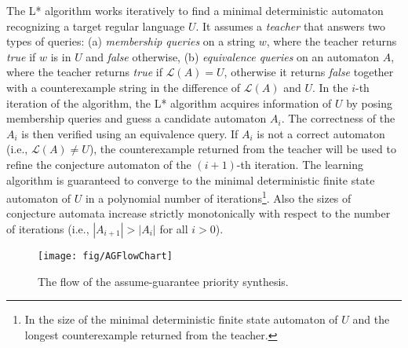\documentclass[10pt, a4paper, onecolumn, conference, compsocconf]{IEEEtran}
\begin{document}
The L* algorithm works iteratively to find a minimal deterministic automaton recognizing a target regular language $U$. It assumes a \textit{teacher} that answers two types of queries: (a) \textit{membership queries} on a string $w$,  where the teacher returns \emph{true} if $w$ is in $U$ and \emph{false} otherwise, (b) \textit{equivalence queries} on an automaton $A$, where the teacher returns \emph{true} if $\mathcal{L}(A)=U$, otherwise it returns \emph{false} together with a counterexample string in the difference of $\mathcal{L}(A)$ and $U$.
In the $i$-th iteration of the algorithm, the L* algorithm acquires information of $U$ by posing membership queries and guess a candidate automaton $A_i$. The correctness of the $A_i$ is then verified using an equivalence query. If $A_i$ is not a correct automaton (i.e., $\mathcal{L}(A)\neq U$), the counterexample returned from the teacher will be used to refine the conjecture automaton of the $(i+1)$-th iteration. The learning algorithm is guaranteed to converge to the minimal deterministic finite state automaton of $U$ in a polynomial number of iterations\footnote{In the size of the minimal deterministic finite state automaton of $U$ and the longest counterexample returned from the teacher.}. Also the sizes of conjecture automata increase strictly monotonically with respect to the number of iterations (i.e., $|A_{i+1}|>|A_{i}|$ for all $i>0$).

\begin{figure}[t]
\centering
 \texttt{[image: fig/AGFlowChart]}
  \caption{The flow of the assume-guarantee priority synthesis.}
 \label{fig:agflow}
\end{figure}
\end{document}

